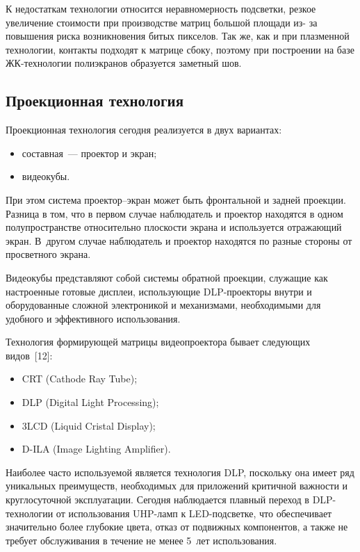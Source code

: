 \begin{multicols}{2}
     К недостаткам технологии относится неравномерность подсветки, 
резкое увеличение стоимости при производстве матриц большой площади из-
за повышения риска возникновения битых пикселов. Так же, как и при 
плазменной технологии, контакты подходят к матрице сбоку, поэтому при 
построении на базе ЖК-технологии полиэкранов образуется заметный шов.

\subsection{Проекционная технология} %

     Проекционная технология сегодня реализуется в двух вариантах: 
     \begin{itemize}
\item составная~--- проектор и экран;
\item видеокубы.
\end{itemize}
     
     При этом система проектор--экран может быть фронтальной и задней 
проекции. Разница в том, что в первом случае наблюдатель и проектор 
находятся в одном полупространстве относительно плоскости экрана и 
используется отражающий экран. В~другом случае наблюдатель и проектор 
находятся по разные стороны от просветного экрана. 
     
     Видеокубы представляют собой системы обратной проекции, 
служащие как настроенные готовые дисплеи, использующие DLP-проекторы 
внутри и оборудованные сложной электроникой и механизмами, 
необходимыми для удобного и эффективного использования. 
   
   Технология формирующей матрицы видеопроектора бывает следующих 
видов~[12]: 
   \begin{itemize}
\item CRT (Cathode Ray Tube);
\item DLP (Digital Light Processing);
\item 3LCD (Liquid Cristal Display);
\item D-ILA (Image Lighting Amplifier). 
\end{itemize}
   
   Наиболее часто используемой является технология DLP, поскольку она 
имеет ряд уникальных преимуществ, необходимых для приложений 
критичной важности и круглосуточной эксплуатации. Сегодня наблюдается 
плавный переход в DLP-тех\-но\-ло\-гии от использования UHP-ламп к 
   LED-под\-свет\-ке, что обеспечивает значительно более глубокие цвета, отказ 
от подвижных компонентов, а также не требует обслуживания в течение не 
менее 5~лет использования. 
 

\end{multicols}
